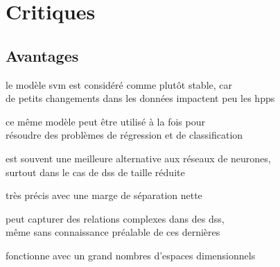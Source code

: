 \section{Critiques}


\subsection{Avantages}


\begin{itmz}

\item{le modèle \gls{svm} est considéré comme plutôt stable, car\\
de petits changements dans les données impactent peu les \glspl{hpp}}

\end{itmz}\begin{itmz}

\item{ce même modèle peut être utilisé à la fois pour\\
résoudre des problèmes de régression et de classification}

\end{itmz}\begin{itmz}

\item{est souvent une meilleure alternative aux réseaux de neurones,\\
surtout dans le cas de \glspl{ds} de taille réduite}

\end{itmz}\begin{itmz}

\item{très précis avec une marge de séparation nette}

\end{itmz}\begin{itmz}

\item{peut capturer des relations complexes dans des \glspl{ds},\\
même sans connaissance préalable de ces dernières}

\end{itmz}\begin{itmz}

\item{fonctionne avec un grand nombres d’espaces dimensionnels}

\end{itmz}\begin{itmz}


\end{itmz}
